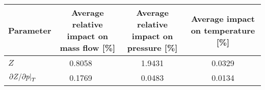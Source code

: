 \begin{table}[!hb]
    \caption{
    }
    \centering
    \begin{tabular}{lclcc}
        \toprule
        Parameter & \multicolumn{2}{c}{\parbox{4cm}{\centering Average relative impact on mass flow [\si{\percent}]}} & \parbox{4cm}{\centering Average relative impact on pressure [\si{\percent}]} & \parbox{4cm}{\centering Average impact on temperature [\si{\percent}]} \\
        \midrule
        $Z$ & 0.8058 & \colorbox{green}{\hspace{0.8058cm}} & 1.9431 & 0.0329 \\
        $\eval{\partial Z/\partial p}_T$ & 0.1769 & \colorbox{green}{\hspace{0.1769cm}} & 0.0483 & 0.0134 \\
        \bottomrule
    \end{tabular}
\end{table}